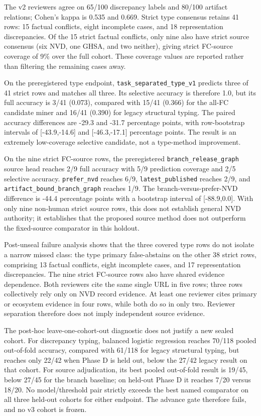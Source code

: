 The v2 reviewers agree on 65/100 discrepancy labels and 80/100 artifact relations; Cohen's kappa is 0.535 and 0.669. Strict type consensus retains 41 rows: 15 factual conflicts, eight incomplete cases, and 18 representation discrepancies. Of the 15 strict factual conflicts, only nine also have strict source consensus (six NVD, one GHSA, and two neither), giving strict FC-source coverage of 9\% over the full cohort. These coverage values are reported rather than filtering the remaining cases away.

On the preregistered type endpoint, \texttt{task\_separated\_type\_v1} predicts three of 41 strict rows and matches all three. Its selective accuracy is therefore 1.0, but its full accuracy is 3/41 (0.073), compared with 15/41 (0.366) for the all-FC candidate miner and 16/41 (0.390) for legacy structural typing. The paired accuracy differences are -29.3 and -31.7 percentage points, with row-bootstrap intervals of [-43.9,-14.6] and [-46.3,-17.1] percentage points. The result is an extremely low-coverage selective candidate, not a type-method improvement.

On the nine strict FC-source rows, the preregistered \texttt{branch\_release\_graph} source head reaches 2/9 full accuracy with 5/9 prediction coverage and 2/5 selective accuracy. \texttt{prefer\_nvd} reaches 6/9, \texttt{latest\_published} reaches 2/9, and \texttt{artifact\_bound\_branch\_graph} reaches 1/9. The branch-versus-prefer-NVD difference is -44.4 percentage points with a bootstrap interval of [-88.9,0.0]. With only nine non-human strict source rows, this does not establish general NVD authority; it establishes that the proposed source method does not outperform the fixed-source comparator in this holdout.

Post-unseal failure analysis shows that the three covered type rows do not isolate a narrow missed class: the type primary false-abstains on the other 38 strict rows, comprising 13 factual conflicts, eight incomplete cases, and 17 representation discrepancies. The nine strict FC-source rows also have shared evidence dependence. Both reviewers cite the same single URL in five rows; three rows collectively rely only on NVD record evidence. At least one reviewer cites primary or ecosystem evidence in four rows, while both do so in only two. Reviewer separation therefore does not imply independent source evidence.

The post-hoc leave-one-cohort-out diagnostic does not justify a new sealed cohort. For discrepancy typing, balanced logistic regression reaches 70/118 pooled out-of-fold accuracy, compared with 61/118 for legacy structural typing, but reaches only 22/42 when Phase D is held out, below the 27/42 legacy result on that cohort. For source adjudication, its best pooled out-of-fold result is 19/45, below 27/45 for the branch baseline; on held-out Phase D it reaches 7/20 versus 18/20. No model/threshold pair strictly exceeds the best named comparator on all three held-out cohorts for either endpoint. The advance gate therefore fails, and no v3 cohort is frozen.

